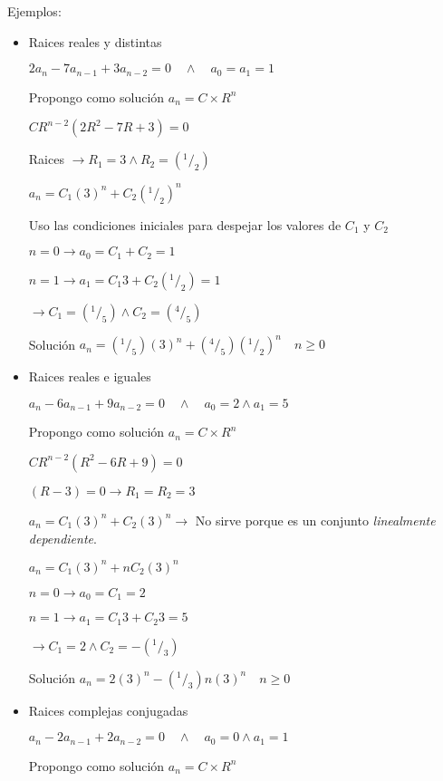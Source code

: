 \documentclass[a4paper, twoside]{article}
\begin{document}
		Ejemplos:
		\begin{itemize}
			\item Raices reales y distintas
			
			$2a_n - 7 a_{n-1} + 3 a_{n-2} = 0 \quad \wedge \quad a_0 = a_1 = 1$
			
			Propongo como solución $a_n = C \times R^n$
			
			$C R^{n-2} \left(2R^2 - 7R + 3 \right) = 0$
		
			Raices $\rightarrow R_1 = 3 \wedge R_2 = (^1/_2)$
			
			$a_n = C_1 (3)^n + C_2 (^1/_2)^n$ 
			
			Uso las condiciones iniciales para despejar los valores de $C_1$ y $C_2$
			
			$n=0 \rightarrow a_0 = C_1+C_2 = 1$
			
			$n=1 \rightarrow a_1 = C_1 3+C_2 (^1/_2) = 1$
			
			$\rightarrow C_1 = (^1/_5) \wedge C_2 = (^4/_5)$
			
			Solución $a_n = (^1/_5)(3)^n + (^4/_5)(^1/_2)^n \quad n \geq 0$
			
			\item Raices reales e iguales
			
			$a_n - 6 a_{n-1} + 9 a_{n-2} = 0 \quad \wedge \quad a_0 = 2 \wedge a_1 = 5$
			
			Propongo como solución $a_n = C \times R^n$
			
			$C R^{n-2} \left(R^2 - 6R + 9 \right) = 0$
			
			$\left(R - 3 \right) = 0 \rightarrow R_1=R_2=3$
			
			$a_n= C_1 (3)^n + C_2 (3)^n \rightarrow$ No sirve porque es un conjunto \emph{linealmente dependiente}.
			
			$a_n = C_1 (3)^n + n C_2 (3)^n$
			
			$n=0 \rightarrow a_0 = C_1 = 2$
			
			$n=1 \rightarrow a_1 = C_1 3+C_2 3 = 5$
			
			$\rightarrow C_1 = 2 \wedge C_2 =- (^1/_3)$
			
			Solución $a_n = 2(3)^n - (^1/_3)n(3)^n \quad n \geq 0$
			
			\item Raices complejas conjugadas
			
			$a_n - 2 a_{n-1} + 2 a_{n-2} = 0 \quad \wedge \quad a_0 = 0 \wedge a_1 = 1$
			
			Propongo como solución $a_n = C \times R^n$
			

\end{itemize}
\end{document}
